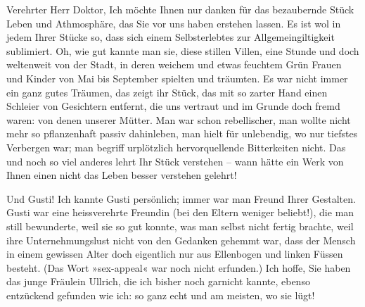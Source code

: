 \pstart{}Verehrter Herr Doktor,\pend\vspace{0.5em}
\pstart
           Ich möchte Ihnen nur danken für das bezaubernde Stück Leben und Athmosphäre, das Sie \label{K_L02567-1v}\label{K_L02567-1} vor uns haben erstehen lassen. Es ist wol in jedem Ihrer Stücke so, dass sich
               einem Selbsterlebtes zur Allgemeingiltigkeit sublimiert. Oh, wie gut kannte man sie,
               diese stillen Villen, eine Stunde und doch weltenweit von der Stadt, in deren weichem
               und etwas feuchtem Grün Frauen und Kinder von Mai bis September spielten und
               träumten. Es war nicht immer ein ganz gutes Träumen, das zeigt ihr Stück, das mit so zarter Hand einen
               Schleier von Gesichtern entfernt, die uns  vertraut
               und im Grunde doch fremd waren: von denen unserer Mütter. Man war schon rebellischer,
               man wollte nicht mehr so pflanzenhaft passiv dahinleben, man hielt für unlebendig, wo
               nur tiefstes Verbergen war; man begriff urplötzlich hervorquellende Bitterkeiten
               nicht. Das und noch so viel anderes lehrt Ihr Stück verstehen – wann hätte ein Werk von Ihnen einen nicht
               das Leben besser verstehen gelehrt!\pend
           
\pstart
           Und Gusti! Ich kannte Gusti persönlich; immer war man
               Freund Ihrer Gestalten. Gusti
               war eine heissverehrte Freundin (bei den Eltern weniger beliebt!), die man still
               bewunderte, weil sie so gut konnte, was man selbst nicht fertig brachte, weil ihre
               Unternehmungslust nicht von den Gedanken gehemmt war, dass der Mensch in einem
               gewissen Alter doch eigentlich nur aus Ellenbogen und linken Füssen besteht. (Das
               Wort »sex-appeal« war noch nicht erfunden.) Ich hoffe, Sie haben das junge Fräulein
                  Ullrich, die ich bisher noch garnicht
               kannte, ebenso entzückend gefunden wie ich: so ganz echt und am meisten, wo sie
               lügt!\pend
           
